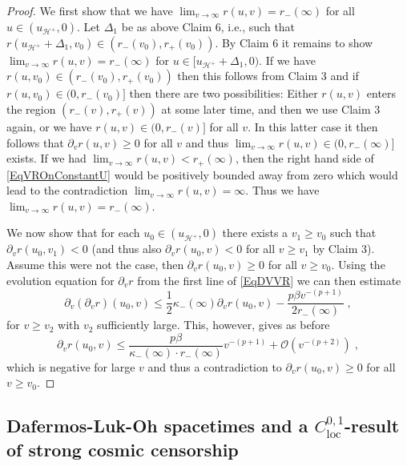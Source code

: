 \documentclass[reqno]{article}
\newcommand{\loc}{\mathrm{loc}}
\newcommand{\uh}{u_{\mathcal{H}^+}}
\newcommand{\rd}{\partial}
\begin{document}
\begin{proof}
We first show that we have $\lim_{v \to \infty} r(u,v) = r_-(\infty)$ for all $u \in (\uh, 0)$. Let $\Delta_1$ be as above Claim 6, i.e., such that $r(\uh + \Delta_1, v_0) \in (r_-(v_0), r_+(v_0))$. By Claim 6 it remains to show $\lim_{v \to \infty} r(u,v) = r_-(\infty)$ for $u \in [\uh + \Delta_1, 0)$. If we have $r(u,v_0) \in (r_-(v_0), r_+(v_0))$ then this follows from Claim 3 and if $r(u,v_0) \in (0, r_-(v_0)]$ then there are two possibilities: Either $r(u,v)$ enters the region $(r_-(v), r_+(v))$ at some later time, and then we use Claim 3 again, or we have $r(u,v) \in (0, r_-(v)]$ for all $v$. In this latter case it then follows that $\partial_v r(u,v) \geq 0$ for all $v$ and thus $\lim_{v \to \infty} r(u,v) \in (0, r_-(\infty)]$ exists. If we had $\lim_{v \to \infty} r(u,v) < r_+(\infty)$, then the right hand side of \eqref{EqVROnConstantU} would be positively bounded away from zero which would lead to the contradiction $\lim_{v \to \infty} r(u,v) = \infty$. Thus we have $\lim_{v \to \infty} r(u,v) = r_-(\infty)$.

We now show that for each $u_0 \in (\uh, 0)$ there exists a $v_1 \geq v_0$ such that $\rd_vr(u_0,v_1) <0$ (and thus also $\rd_v r(u_0,v) <0$ for all $v \geq v_1$ by Claim 3). Assume this were not the case, then $\rd_vr(u_0,v) \geq 0$ for all $v \geq v_0$. Using the evolution equation for $\rd_v r$ from the  first line of \eqref{EqDVVR} we can then estimate
$$\rd_v(\rd_v r)(u_0,v) \leq \frac{1}{2} \kappa_-(\infty) \rd_v r(u_0, v)-\frac{p \beta v^{-(p+1)}}{2 r_-(\infty)}\;,$$
for $v \geq v_2$ with $v_2$ sufficiently large. This, however, gives as before $$\rd_v r(u_0, v) \leq  \frac{p \beta }{\kappa_-(\infty) \cdot  r_-(\infty)} v^{-(p+1)} + \mathcal{O}(v^{-(p+2)}) \;,$$
which is negative for large $v$ and thus a contradiction to $\rd_vr (u_0,v) \geq 0$ for all $v \geq v_0$.
\end{proof}




\subsection{Dafermos-Luk-Oh spacetimes and a $C^{0,1}_{\loc}$-result of strong cosmic censorship} \label{SecDLO}
\end{document}

